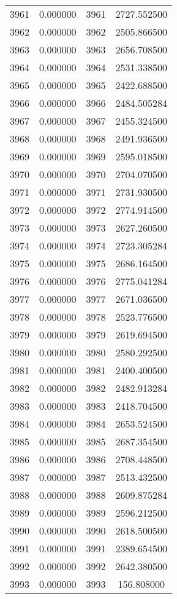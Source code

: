 \documentclass[12pt]{article}
\begin{document}
\begin{longtable}{@{}cccc@{}}
3961 & 0.000000 & 3961 & 2727.552500 \\
3962 & 0.000000 & 3962 & 2505.866500 \\
3963 & 0.000000 & 3963 & 2656.708500 \\
3964 & 0.000000 & 3964 & 2531.338500 \\
3965 & 0.000000 & 3965 & 2422.688500 \\
3966 & 0.000000 & 3966 & 2484.505284 \\
3967 & 0.000000 & 3967 & 2455.324500 \\
3968 & 0.000000 & 3968 & 2491.936500 \\
3969 & 0.000000 & 3969 & 2595.018500 \\
3970 & 0.000000 & 3970 & 2704.070500 \\
3971 & 0.000000 & 3971 & 2731.930500 \\
3972 & 0.000000 & 3972 & 2774.914500 \\
3973 & 0.000000 & 3973 & 2627.260500 \\
3974 & 0.000000 & 3974 & 2723.305284 \\
3975 & 0.000000 & 3975 & 2686.164500 \\
3976 & 0.000000 & 3976 & 2775.041284 \\
3977 & 0.000000 & 3977 & 2671.036500 \\
3978 & 0.000000 & 3978 & 2523.776500 \\
3979 & 0.000000 & 3979 & 2619.694500 \\
3980 & 0.000000 & 3980 & 2580.292500 \\
3981 & 0.000000 & 3981 & 2400.400500 \\
3982 & 0.000000 & 3982 & 2482.913284 \\
3983 & 0.000000 & 3983 & 2418.704500 \\
3984 & 0.000000 & 3984 & 2653.524500 \\
3985 & 0.000000 & 3985 & 2687.354500 \\
3986 & 0.000000 & 3986 & 2708.448500 \\
3987 & 0.000000 & 3987 & 2513.432500 \\
3988 & 0.000000 & 3988 & 2609.875284 \\
3989 & 0.000000 & 3989 & 2596.212500 \\
3990 & 0.000000 & 3990 & 2618.500500 \\
3991 & 0.000000 & 3991 & 2389.654500 \\
3992 & 0.000000 & 3992 & 2642.380500 \\
3993 & 0.000000 & 3993 & 156.808000 \\

\end{longtable}
\end{document}
